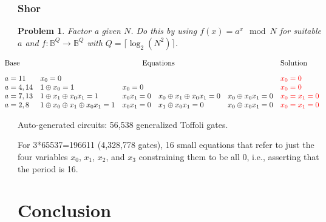 \documentclass{beamer}
\newcommand{\red}[1]{{\color{red}{#1}}}
\newcommand{\Bool}{\ensuremath{\mathbb{B}}}
\newtheorem{prob}{Problem}
\begin{document}

\begin{frame}

  \frametitle{Shor}

\begin{prob}
  Factor a given $N$. Do this by using $f(x) = a^x \mod N$ for suitable $a$ and
  $f : \Bool^Q \rightarrow \Bool^Q$ with $Q = \lceil \log_2 \left(N^2\right) \rceil$.
\end{prob}

  {\tiny
\[\begin{array}{l@{\quad}lllll}
  \hspace*{-8mm}\textrm{Base} & \multicolumn{4}{c}{\textrm{Equations}} & \textrm{Solution} \\[2ex]
  \hspace*{-8mm} a=11 & x_0 = 0 &&&& \red{x_0 = 0} \\
  \hspace*{-8mm} a=4,14 & 1 \oplus x_0 = 1 & x_0 = 0 && & \red{x_0 = 0} \\
  \hspace*{-8mm} a=7,13 & 1 \oplus x_1 \oplus x_0x_1 = 1 & x_0x_1 = 0 & x_0 \oplus x_1 \oplus x_0x_1 = 0 &  x_0 \oplus x_0x_1 = 0 & \red{x_0=x_1=0} \\
  \hspace*{-8mm} a=2,8 & 1 \oplus x_0 \oplus x_1 \oplus x_0x_1 = 1 & x_0x_1 = 0 & x_1 \oplus x_0x_1 = 0 & x_0 \oplus x_0x_1 = 0  & \red{x_0=x_1=0}
\end{array}\]
  }

  Auto-generated circuits: 56,538 generalized Toffoli gates. 

  \pause
  \vspace*{4mm}
  For 3*65537=196611 (4,328,778 gates),
   16 small equations that refer to just the four variables $x_0$, $x_1$, $x_2$, and $x_3$
constraining them to be all 0, i.e.,
asserting that the period is 16.
\end{frame}

\section[Conclusion]{Conclusion}
\end{document}
